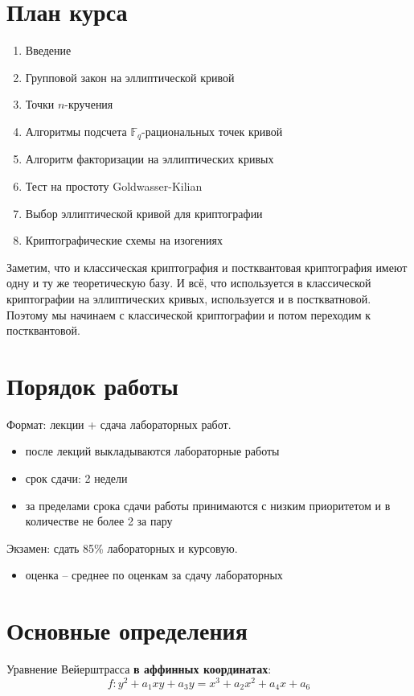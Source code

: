 \documentclass[11pt]{exam}
\theoremstyle{definition}
\begin{document}
{\section{План курса}
\begin{enumerate}
	\item Введение
	\item Групповой закон на эллиптической кривой
	\item Точки $n$-кручения
	\item Алгоритмы подсчета $\mathbb{F}_q$-рациональных точек кривой
	\item Алгоритм факторизации на эллиптических кривых
	\item Тест на простоту Goldwasser-Kilian
	\item Выбор эллиптической кривой для криптографии
	\item Криптографические схемы на изогениях
\end{enumerate}

Заметим, что и классическая криптография и постквантовая криптография имеют одну и ту же теоретическую базу. И всё, что используется в классической криптографии на эллиптических кривых, используется и в посткватновой. Поэтому мы начинаем с классической криптографии и потом переходим к постквантовой.

\section{Порядок работы}
Формат: лекции + сдача лабораторных работ.
\vspace{0.5em}
\begin{itemize}
	\item после лекций выкладываются лабораторные работы
	\item срок сдачи: {2} недели
	\item за пределами срока сдачи работы принимаются с низким приоритетом и в количестве не более {2} за пару
\end{itemize}
\vspace{0.5em}
{Экзамен}: сдать {85\%} лабораторных и {курсовую}.
\begin{itemize}
	\item оценка -- среднее по оценкам за сдачу лабораторных
\end{itemize}

\section{Основные определения}
	Уравнение Вейерштрасса \textbf{в аффинных координатах}:
\begin{equation}\label{eq:weierstrassequation}
	f: y^2+a_1xy + a_3y = x^3 + a_2x^2 + a_4x + a_6
\end{equation}

}
\end{document}
